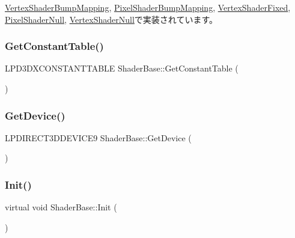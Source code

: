 \mbox{\hyperlink{class_vertex_shader_bump_mapping_a7979584d035fff86d386c99617a8dd2c}{Vertex\+Shader\+Bump\+Mapping}}, \mbox{\hyperlink{class_pixel_shader_bump_mapping_af62a2b40930533a3bae17319f876705d}{Pixel\+Shader\+Bump\+Mapping}}, \mbox{\hyperlink{class_vertex_shader_fixed_a82bf2829b6fd0df26faedcbf650ba08d}{Vertex\+Shader\+Fixed}}, \mbox{\hyperlink{class_pixel_shader_null_a99c712ab174da29ba26a893820b64799}{Pixel\+Shader\+Null}}, \mbox{\hyperlink{class_vertex_shader_null_a95f1a66045fb39c42cf0566f1990b6a1}{Vertex\+Shader\+Null}}で実装されています。

\mbox{\label{class_shader_base_a85a5c17b56b6ffa29f7784ab42696d7c}} 
\subsubsection{\texorpdfstring{Get\+Constant\+Table()}{GetConstantTable()}}
{\footnotesize\ttfamily L\+P\+D3\+D\+X\+C\+O\+N\+S\+T\+A\+N\+T\+T\+A\+B\+LE Shader\+Base\+::\+Get\+Constant\+Table (\begin{DoxyParamCaption}{ }\end{DoxyParamCaption})\hspace{0.3cm}{\ttfamily [inline]}}

\mbox{\label{class_shader_base_a4601ff3d20f01800ffd676d3db8d9289}} 
\subsubsection{\texorpdfstring{Get\+Device()}{GetDevice()}}
{\footnotesize\ttfamily L\+P\+D\+I\+R\+E\+C\+T3\+D\+D\+E\+V\+I\+C\+E9 Shader\+Base\+::\+Get\+Device (\begin{DoxyParamCaption}{ }\end{DoxyParamCaption})\hspace{0.3cm}{\ttfamily [inline]}}

\mbox{\label{class_shader_base_a9622b2f5e0184a78d3af82820dc5113d}} 
\subsubsection{\texorpdfstring{Init()}{Init()}}
{\footnotesize\ttfamily virtual void Shader\+Base\+::\+Init (\begin{DoxyParamCaption}{ }\end{DoxyParamCaption})\hspace{0.3cm}{\ttfamily [pure virtual]}}



